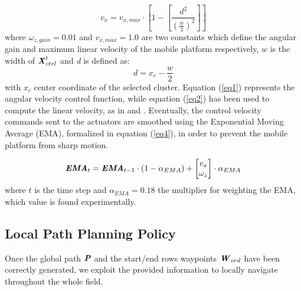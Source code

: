 \documentclass[journal]{IEEEtran}
\begin{document}
\begin{equation}
\label{eq2}
v_{x} = v_{x,max} \cdot \left [ 1 - \left [\frac{d^{2}}{(\frac{w}{2})^{2}} \right ] \right ] 
\end{equation}
where $\omega_{z,gain}=0.01$ and $v_{x,max}=1.0$ are two constants which define the angular gain and maximum linear velocity of the mobile platform respectively, $w$ is the width of $\textbf{\textit{X}}_{ctrl}^{t}$ and \emph{d} is defined as:
    \begin{equation}
    \label{eq3}
    d = x_{c} - \frac{w}{2}
    \end{equation} 
with $x_{c}$ center coordinate of the selected cluster.
Equation (\ref{eq1}) represents the angular velocity control function, while equation (\ref{eq2}) has been used to compute the linear velocity, as in \cite{aghi2020local} and \cite{aghi2021deep}. 
Eventually, the control velocity commands sent to the actuators are smoothed using the Exponential Moving Average (EMA), formalized in equation (\ref{eq4}), in order to prevent the mobile platform from sharp motion.

\begin{equation}
    \label{eq4}
   \textbf{\textit{EMA}}_t=\textbf{\textit{EMA}}_{t-1} \cdot (1 - \alpha_{EMA}) + \begin{bmatrix} v_x \\ \omega_z  \end{bmatrix} \cdot \alpha_{EMA}
    \end{equation} 
where $t$ is the time step and $\alpha_{EMA}=0.18$ the multiplier for weighting the EMA, which value is found experimentally.


\subsection{Local Path Planning Policy}
Once the global path $\textbf{\emph{P}}$ and the start/end rows waypoints $\textbf{\emph{W}}_{ord}$ have been correctly generated, we exploit the provided information to locally navigate throughout the whole field. 
\end{document}
